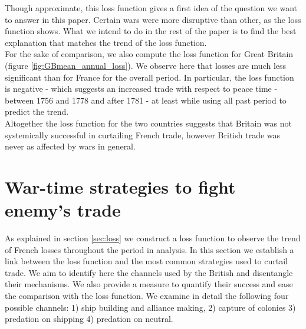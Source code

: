 \documentclass[12pt,a4paper,notitlepage,english]{article}
\begin{document}
Though approximate, this loss function gives a first idea of the question we want to answer in this paper. Certain wars were more disruptive than other, as the loss function shows. What we intend to do in the rest of the paper is to find the best explanation that matches the trend of the loss function. \\ 
For the sake of comparison, we also compute the loss function for Great Britain (figure \ref{fig:GBmean_annual_loss}). We observe here that losses are much less significant than for France for the overall period. In particular, the loss function is negative - which suggests an increased trade with respect to peace time - between 1756 and 1778 and after 1781 - at least while using all past period to predict the trend. \\
Altogether the loss function for the two countries suggests that Britain was not systemically successful in curtailing French trade, however British trade was never as affected by wars in general.  

\section{War-time strategies to fight enemy's trade}
\label{sec:wartime_strategies}
As explained in section \ref{sec:loss} we construct a loss function to observe the trend of French losses throughout the period in analysis. In this section we establish a link between the loss function and the most common strategies used to curtail trade. We aim to identify here the channels used by the British and disentangle their mechanisms. We also provide a measure to quantify their success and ease the comparison with the loss function. We examine in detail the following four possible channels: 1) ship building and alliance making, 2) capture of colonies 3) predation on shipping 4) predation on neutral.  
\end{document}
